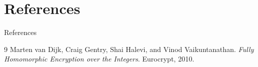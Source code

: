 \documentclass[10pt, aspectratio=169]{beamer}
\begin{document}
\section{References}
\begin{frame}{References}
    \begin{thebibliography}{9}
        Marten van Dijk, Craig Gentry, Shai Halevi, and Vinod Vaikuntanathan.
        \textit{Fully Homomorphic Encryption over the Integers}. 
        Eurocrypt, 2010.
    \end{thebibliography}
\end{frame}
\end{document}

